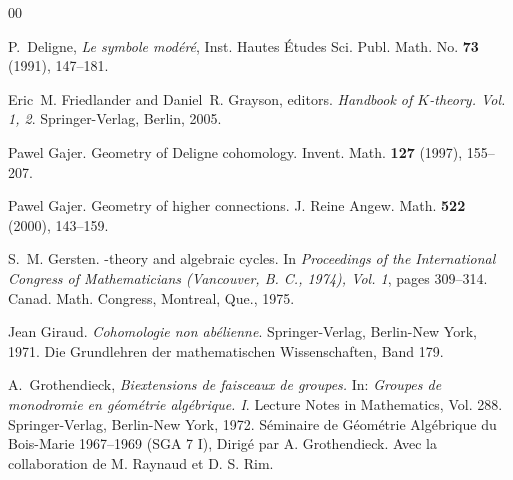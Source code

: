 \documentclass{amsart}
\numberwithin{equation}{subsection}
\theoremstyle{remark}
\theoremstyle{remark}
\begin{document}
\begin{thebibliography}{00}

 P.~Deligne, \emph{Le symbole mod\'er\'e},  
Inst. Hautes {\'E}tudes Sci. Publ. Math. No. {\bf 73} (1991), 147--181. 



Eric~M. Friedlander and Daniel~R. Grayson, editors.
\newblock \emph{Handbook of {$K$}-theory. {V}ol. 1, 2}.
\newblock Springer-Verlag, Berlin, 2005.

 Pawel Gajer.
\newblock Geometry of {D}eligne cohomology.
\newblock Invent. Math. {\bf 127} (1997), 155--207.

 Pawel Gajer.
\newblock Geometry of higher connections.
\newblock J. Reine Angew. Math. {\bf 522} (2000), 143--159.


 S.~M. Gersten.
-theory and algebraic cycles.
\newblock In \emph{Proceedings of the {I}nternational {C}ongress of
  {M}athematicians ({V}ancouver, {B}. {C}., 1974), {V}ol. 1}, pages 309--314.
  Canad. Math. Congress, Montreal, Que., 1975.


 Jean Giraud.
\newblock \emph{Cohomologie non ab\'elienne}.
\newblock Springer-Verlag, Berlin-New York, 1971.
\newblock Die Grundlehren der mathematischen Wissenschaften, Band 179.

A.~Grothendieck, \newblock \emph{Biextensions de faisceaux de groupes.} \newblock In: \emph{Groupes de monodromie en g\'eom\'etrie alg\'ebrique. {I}}.
\newblock Lecture Notes in Mathematics, Vol. 288. Springer-Verlag, Berlin-New
  York, 1972.
\newblock S{\'e}minaire de G{\'e}om{\'e}trie Alg{\'e}brique du Bois-Marie
  1967--1969 (SGA 7 I), Dirig{\'e} par A. Grothendieck. Avec la collaboration
  de M. Raynaud et D. S. Rim.



\end{thebibliography}
\end{document}
